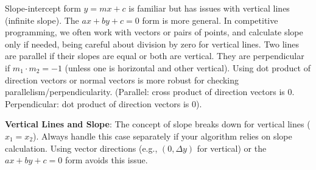 \begin{intuition}
\label{intuition:A.1.2.slope_intercept}
Slope-intercept form $y=mx+c$ is familiar but has issues with vertical lines (infinite slope). The $ax+by+c=0$ form is more general.
In competitive programming, we often work with vectors or pairs of points, and calculate slope only if needed, being careful about division by zero for vertical lines.
Two lines are parallel if their slopes are equal or both are vertical. They are perpendicular if $m_1 \cdot m_2 = -1$ (unless one is horizontal and other vertical). Using dot product of direction vectors or normal vectors is more robust for checking parallelism/perpendicularity. (Parallel: cross product of direction vectors is 0. Perpendicular: dot product of direction vectors is 0).
\end{intuition}

\begin{gotcha}
\label{gotcha:A.1.2.vertical_lines_slope}
\textbf{Vertical Lines and Slope}: The concept of slope breaks down for vertical lines ($x_1 = x_2$). Always handle this case separately if your algorithm relies on slope calculation. Using vector directions (e.g., $(0, \Delta y)$ for vertical) or the $ax+by+c=0$ form avoids this issue.
\end{gotcha}